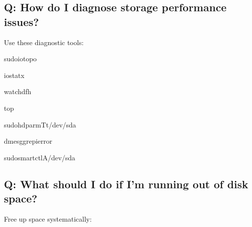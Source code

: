 \documentclass[letterpaper,10pt,english]{sphinxmanual}
\begin{document}
\subsection{Q: How do I diagnose storage performance issues?}
\label{\detokenize{faq:q-how-do-i-diagnose-storage-performance-issues}}
\sphinxAtStartPar
{} Use these diagnostic tools:

\begin{sphinxVerbatim}[commandchars=\\\{\}]
sudoiotop\PYGZhy{}o

iostat\PYGZhy{}x

watchdf\PYGZhy{}h

top

sudohdparm\PYGZhy{}Tt/dev/sda

dmesggrep\PYGZhy{}ierror

sudosmartctl\PYGZhy{}A/dev/sda
\end{sphinxVerbatim}


\subsection{Q: What should I do if I’m running out of disk space?}
\label{\detokenize{faq:q-what-should-i-do-if-i-m-running-out-of-disk-space}}
\sphinxAtStartPar
{} Free up space systematically:
\end{document}
